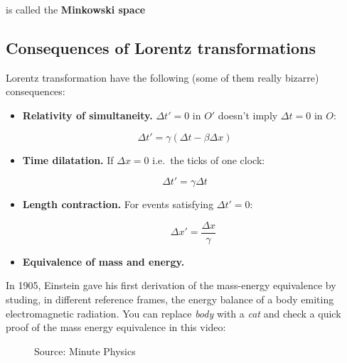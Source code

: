 \documentclass[
  letterpaper,
  DIV=11,
  numbers=noendperiod]{scrreprt}
\providecommand{\tightlist}{%
  \setlength{\itemsep}{0pt}\setlength{\parskip}{0pt}}\usepackage{longtable,booktabs,array}
\begin{document}
is called the \textbf{Minkowski space}

\subsection*{Consequences of Lorentz
transformations}\label{consequences-of-lorentz-transformations}

Lorentz transformation have the following (some of them really bizarre)
consequences:

\begin{itemize}
\tightlist
\item
  \textbf{Relativity of simultaneity.} \(\Delta t' = 0\) in \(O'\)
  doesn't imply \(\Delta t = 0\) in \(O\):
\end{itemize}

\[\Delta t' = \gamma(\Delta t - \beta \Delta x)\]

\begin{itemize}
\tightlist
\item
  \textbf{Time dilatation.} If \(\Delta x = 0\) i.e.~the ticks of one
  clock:
\end{itemize}

\[\Delta t' = \gamma \Delta t\]

\begin{itemize}
\item
  \textbf{Length contraction.} For events satisfying \(\Delta t' = 0\):

  \[\Delta x' = \frac{\Delta x}{\gamma}\]
\item
  \textbf{Equivalence of mass and energy.}
\end{itemize}

In 1905, Einstein gave his first derivation of the mass-energy
equivalence by studing, in different reference frames, the energy
balance of a body emiting electromagnetic radiation. You can replace
\emph{body} with a \emph{cat} and check a quick proof of the mass energy
equivalence in this video:

\begin{figure}


\caption{\label{fig-minute}Source: Minute Physics}

\end{figure}%
\end{document}
